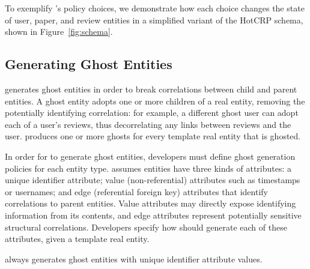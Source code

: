 To exemplify \sys's policy choices, we demonstrate how each choice changes the state of user, paper,
and review entities in a simplified variant of the HotCRP schema, shown in Figure~\ref{fig:schema}.

\subsection{Generating Ghost Entities}
\label{sec:ghosting}

\sys generates ghost entities in order to break correlations between child and parent entities.  A
ghost entity adopts one or more children of a real entity, removing the potentially identifying
correlation: for example, a different ghost user can adopt each of a user's reviews, thus
decorrelating any links between reviews and the user. \sys produces one or more ghosts for every
template real entity that is ghosted. 

In order for \sys to generate ghost entities, developers must define ghost generation policies for
each entity type.  \sys assumes entities have three kinds of attributes: a unique identifier
attribute; value (non-referential) attributes such as timestamps or usernames; and edge (referential
foreign key) attributes that identify correlations to parent entities.  Value attributes may
directly expose identifying information from its contents, and edge attributes represent potentially
sensitive structural correlations.  Developers specify how \sys should generate each of these
attributes, given a template real entity.

\sys always generates ghost entities with unique identifier attribute values.

